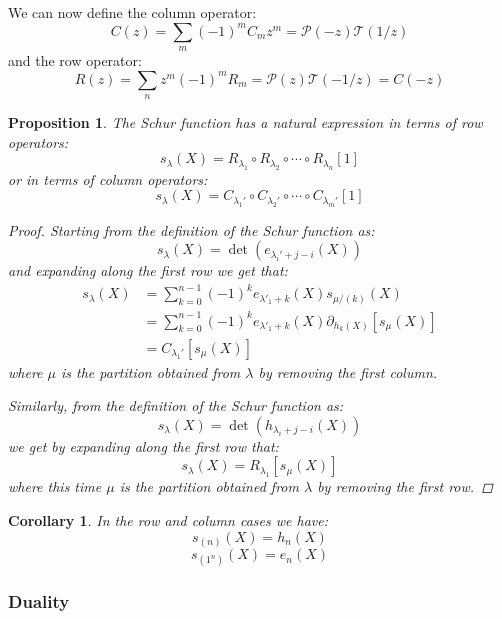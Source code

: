 \documentclass[12pt,dvips]{amsart}
\newtheorem{corollary}{Corollary}[section]
\newtheorem{proposition}{Proposition}[section]
\begin{document}
\noindent
We can now define the column operator:
\begin{equation}\label{colop}
C(z) = \sum_m (-1)^m C_m z^m = \mathcal{P}(-z) \mathcal{T}(1/z) 
\end{equation}
and the row operator:
\begin{equation}\label{rowop}
R(z) = \sum_n z^m (-1)^m R_m = \mathcal{P}(z) \mathcal{T}(-1/z) = C(-z)
\end{equation}

\begin{proposition} \label{determinant}
The Schur function has a natural expression in terms of row operators:
$$ s_\lambda(X) = R_{\lambda_1} \circ R_{\lambda_2} \circ \cdots \circ R_{\lambda_n}[1] $$
or in terms of column operators:
$$ s_\lambda(X) = C_{\lambda_1'} \circ C_{\lambda_2'} \circ \cdots \circ C_{\lambda_m'}[1] $$
\begin{proof}


Starting from the definition of the Schur function as:
$$ s_\lambda(X) = \det( e_{\lambda_i' + j - i}(X) ) $$
and expanding along the first row we get that:
\begin{align*}
s_\lambda(X) & =  \sum_{k=0}^{n-1} (-1)^{k} e_{\lambda'_1 + k}(X) s_{\mu / (k)}(X) \\
& =  \sum_{k=0}^{n-1} (-1)^k e_{\lambda'_1 + k}(X) \partial_{h_k(X)}[ s_\mu(X) ] \\
& =  C_{\lambda_1'}[s_\mu(X)] 
\end{align*}
where $\mu$ is the partition obtained from $\lambda$ by removing the first column.


\par\bigskip
Similarly, from the definition of the Schur function as:
$$ s_\lambda(X) = \det( h_{\lambda_i + j - i}(X) )$$
we get by expanding along the first row that:
$$ s_\lambda(X) = R_{\lambda_1}[s_\mu(X)] $$
where this time $\mu$ is the partition obtained from $\lambda$ by removing the first {\it row}.

\end{proof}

\end{proposition}

\begin{corollary}\label{basecase}
In the row and column cases we have:
$$s_{(n)}(X) = h_n(X)$$
$$ s_{(1^n)}(X) = e_n(X) $$
\end{corollary}

\subsubsection{Duality}
\end{document}
